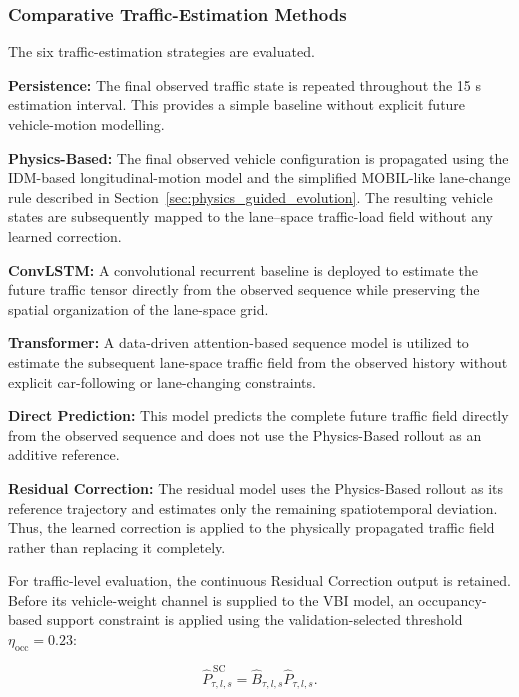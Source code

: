 \documentclass[journal]{IEEEtran}
\begin{document}
\subsubsection{Comparative Traffic-Estimation Methods}

The six
traffic-estimation strategies are evaluated.

\textbf{Persistence:}
The final observed traffic state is repeated throughout the 15 s estimation
interval. This provides a simple baseline without explicit future
vehicle-motion modelling.

\textbf{Physics-Based:}
The final observed vehicle configuration is propagated using the IDM-based
longitudinal-motion model and the simplified MOBIL-like lane-change rule
described in Section~\ref{sec:physics_guided_evolution}. The resulting vehicle states are subsequently mapped
to the lane--space traffic-load field without any learned correction.

\textbf{ConvLSTM:}
A convolutional recurrent baseline is deployed to estimate the future traffic
tensor directly from the observed sequence while preserving the spatial
organization of the lane-space grid.

\textbf{Transformer:}
A data-driven attention-based sequence model is utilized to estimate the
subsequent lane-space traffic field from the observed history without explicit
car-following or lane-changing constraints.

\textbf{Direct Prediction:}
This model predicts the complete future traffic field directly from the
observed sequence and does not use the Physics-Based rollout as an additive
reference.

\textbf{Residual Correction:}
The residual model uses the Physics-Based rollout as its reference trajectory
and estimates only the remaining spatiotemporal deviation. Thus, the learned
correction is applied to the physically propagated traffic field rather than
replacing it completely.

For traffic-level
evaluation, the continuous Residual Correction output is retained. Before its
vehicle-weight channel is supplied to the VBI model, an occupancy-based support
constraint is applied using the validation-selected threshold
$\eta_{\mathrm{occ}}=0.23$:

\begin{equation}
\widehat{P}^{\,\mathrm{SC}}_{\tau,l,s}
=
\widehat{B}_{\tau,l,s}\widehat{P}_{\tau,l,s}.
\label{eq:support_consistent_load}
\end{equation}
\end{document}
